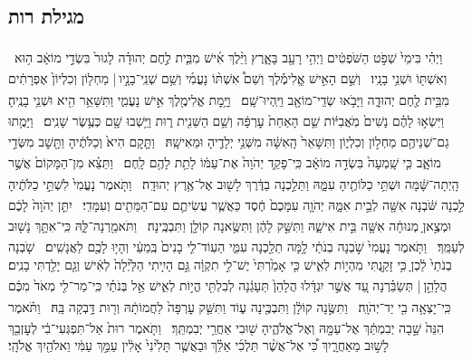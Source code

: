 \documentclass[12pt]{article}
\newcommand{\loc}[1]{\textsuperscript{\locf{#1}}}
\begin{document}
    \setlength{\parindent}{0pt}    
    \beginnumbering
    
\subsection*{מגילת רות}
\pstart
\ledsidenote{{\loc{א פרק}}}
{\loc{ א}~}‏וַיְהִ֗י בִּימֵי֙ שְׁפֹ֣ט הַשֹּׁפְטִ֔ים וַיְהִ֥י רָעָ֖ב בָּאָ֑רֶץ וַיֵּ֨לֶךְ אִ֜ישׁ מִבֵּ֧ית לֶ֣חֶם יְהוּדָ֗ה לָגוּר֙ בִּשְׂדֵ֣י מוֹאָ֔ב ה֥וּא וְאִשְׁתּ֖וֹ וּשְׁנֵ֥י בָנָֽיו׃
{\loc{ ב}~}‏וְשֵׁ֣ם הָאִ֣ישׁ אֱֽלִימֶ֡לֶךְ וְשֵׁם֩ אִשְׁתּ֨וֹ נָעֳמִ֜י וְשֵׁ֥ם שְׁנֵֽי־בָנָ֣יו |  מַחְל֤וֹן וְכִלְיוֹן֙ אֶפְרָתִ֔ים מִבֵּ֥ית לֶ֖חֶם יְהוּדָ֑ה וַיָּבֹ֥אוּ שְׂדֵֽי־מוֹאָ֖ב וַיִּֽהְיוּ־שָֽׁם׃
{\loc{ ג}~}‏וַיָּ֥מׇת אֱלִימֶ֖לֶךְ אִ֣ישׁ נָעֳמִ֑י וַתִּשָּׁאֵ֥ר הִ֖יא וּשְׁנֵ֥י בָנֶֽיהָ׃
{\loc{ ד}~}‏וַיִּשְׂא֣וּ לָהֶ֗ם נָשִׁים֙ מֹֽאֲבִיּ֔וֹת שֵׁ֤ם הָאַחַת֙ עׇרְפָּ֔ה וְשֵׁ֥ם הַשֵּׁנִ֖ית ר֑וּת וַיֵּ֥שְׁבוּ שָׁ֖ם כְּעֶ֥שֶׂר שָׁנִֽים׃
{\loc{ ה}~}‏וַיָּמֻ֥תוּ גַם־שְׁנֵיהֶ֖ם מַחְל֣וֹן וְכִלְי֑וֹן וַתִּשָּׁאֵר֙ הָֽאִשָּׁ֔ה מִשְּׁנֵ֥י יְלָדֶ֖יהָ וּמֵאִישָֽׁהּ׃
{\loc{ ו}~}‏וַתָּ֤קׇם הִיא֙ וְכַלֹּתֶ֔יהָ וַתָּ֖שׇׁב מִשְּׂדֵ֣י מוֹאָ֑ב כִּ֤י שָֽׁמְעָה֙ בִּשְׂדֵ֣ה מוֹאָ֔ב כִּֽי־פָקַ֤ד יְהֹוָה֙ אֶת־עַמּ֔וֹ לָתֵ֥ת לָהֶ֖ם לָֽחֶם׃
{\loc{ ז}~}‏וַתֵּצֵ֗א מִן־הַמָּקוֹם֙ אֲשֶׁ֣ר הָֽיְתָה־שָּׁ֔מָּה וּשְׁתֵּ֥י כַלּוֹתֶ֖יהָ עִמָּ֑הּ וַתֵּלַ֣כְנָה בַדֶּ֔רֶךְ לָשׁ֖וּב אֶל־אֶ֥רֶץ יְהוּדָֽה׃
{\loc{ ח}~}‏וַתֹּ֤אמֶר נָעֳמִי֙ לִשְׁתֵּ֣י כַלֹּתֶ֔יהָ לֵ֣כְנָה שֹּׁ֔בְנָה אִשָּׁ֖ה לְבֵ֣ית אִמָּ֑הּ  יְהֹוָ֤ה עִמָּכֶם֙ חֶ֔סֶד כַּאֲשֶׁ֧ר עֲשִׂיתֶ֛ם עִם־הַמֵּתִ֖ים וְעִמָּדִֽי׃
{\loc{ ט}~}‏יִתֵּ֤ן יְהֹוָה֙ לָכֶ֔ם וּמְצֶ֣אןָ מְנוּחָ֔ה אִשָּׁ֖ה בֵּ֣ית אִישָׁ֑הּ וַתִּשַּׁ֣ק לָהֶ֔ן וַתִּשֶּׂ֥אנָה קוֹלָ֖ן וַתִּבְכֶּֽינָה׃
{\loc{ י}~}‏וַתֹּאמַ֖רְנָה־לָּ֑הּ כִּֽי־אִתָּ֥ךְ נָשׁ֖וּב לְעַמֵּֽךְ׃
{\loc{ יא}~}‏וַתֹּ֤אמֶר נָעֳמִי֙ שֹׁ֣בְנָה בְנֹתַ֔י לָ֥מָּה תֵלַ֖כְנָה עִמִּ֑י הַעֽוֹד־לִ֤י בָנִים֙ בְּֽמֵעַ֔י וְהָי֥וּ לָכֶ֖ם לַאֲנָשִֽׁים׃
{\loc{ יב}~}‏שֹׁ֤בְנָה בְנֹתַי֙ לֵ֔כְןָ כִּ֥י זָקַ֖נְתִּי מִהְי֣וֹת לְאִ֑ישׁ כִּ֤י אָמַ֙רְתִּי֙ יֶשׁ־לִ֣י תִקְוָ֔ה גַּ֣ם הָיִ֤יתִי הַלַּ֙יְלָה֙ לְאִ֔ישׁ וְגַ֖ם יָלַ֥דְתִּי בָנִֽים׃
{\loc{ יג}~}‏הֲלָהֵ֣ן |  תְּשַׂבֵּ֗רְנָה עַ֚ד אֲשֶׁ֣ר יִגְדָּ֔לוּ הֲלָהֵן֙ תֵּעָגֵ֔נָה לְבִלְתִּ֖י הֱי֣וֹת לְאִ֑ישׁ אַ֣ל בְּנֹתַ֗י כִּֽי־מַר־לִ֤י מְאֹד֙ מִכֶּ֔ם כִּֽי־יָצְאָ֥ה בִ֖י יַד־יְהֹוָֽה׃
{\loc{ יד}~}‏וַתִּשֶּׂ֣נָה קוֹלָ֔ן וַתִּבְכֶּ֖ינָה ע֑וֹד וַתִּשַּׁ֤ק עׇרְפָּה֙ לַחֲמוֹתָ֔הּ וְר֖וּת דָּ֥בְקָה בָּֽהּ׃
{\loc{ טו}~}‏וַתֹּ֗אמֶר הִנֵּה֙ שָׁ֣בָה יְבִמְתֵּ֔ךְ אֶל־עַמָּ֖הּ וְאֶל־אֱלֹהֶ֑יהָ שׁ֖וּבִי אַחֲרֵ֥י יְבִמְתֵּֽךְ׃
{\loc{ טז}~}‏וַתֹּ֤אמֶר רוּת֙ אַל־תִּפְגְּעִי־בִ֔י לְעׇזְבֵ֖ךְ לָשׁ֣וּב מֵאַחֲרָ֑יִךְ כִּ֠י אֶל־אֲשֶׁ֨ר תֵּלְכִ֜י אֵלֵ֗ךְ וּבַאֲשֶׁ֤ר תָּלִ֙ינִי֙ אָלִ֔ין עַמֵּ֣ךְ עַמִּ֔י וֵאלֹהַ֖יִךְ אֱלֹהָֽי׃
\end{document}
